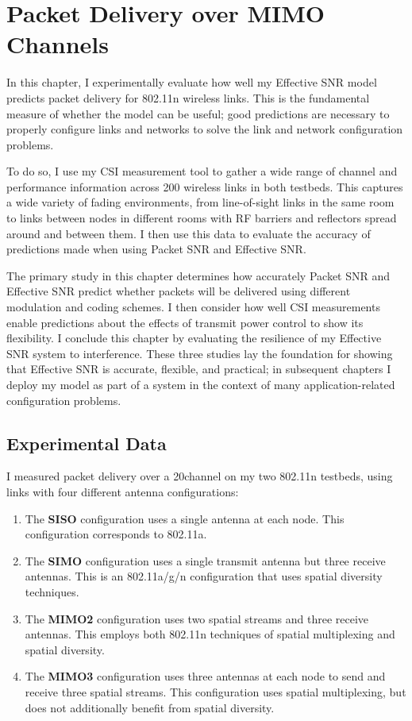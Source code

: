 \ifx\mainfile\undefined

\setcounter{chapter}{5} %
\fi

\cleardoublepage
\chapter{Packet Delivery over MIMO Channels}
\label{chap:delivery}

In this chapter, I experimentally evaluate how well my Effective SNR model predicts packet delivery for 802.11n wireless links. This is the fundamental measure of whether the model can be useful; good predictions are necessary to properly configure links and networks to solve the link and network configuration problems.

To do so, I use my CSI measurement tool to gather a wide range of channel and performance information across 200 wireless links in both testbeds. This captures a wide variety of fading environments, from line-of-sight links in the same room to links between nodes in different rooms with RF barriers and reflectors spread around and between them. I then use this data to evaluate the accuracy of predictions made when using Packet SNR and Effective SNR.

The primary study in this chapter determines how accurately Packet SNR and Effective SNR predict whether packets will be delivered using different modulation and coding schemes. I then consider how well CSI measurements enable predictions about the effects of transmit power control to show its flexibility. I conclude this chapter by evaluating the resilience of my Effective SNR system to interference. These three studies lay the foundation for showing that Effective SNR is accurate, flexible, and practical; in subsequent chapters I deploy my model as part of a system in the context of many application-related configuration problems.

\section{Experimental Data}
I measured packet delivery over a 20\MHz channel on my two 802.11n testbeds, using links with four different antenna configurations:
\begin{enumerate}
\item The \textbf{SISO} configuration uses a single antenna at each node. This configuration corresponds to 802.11a.
\item The \textbf{SIMO} configuration uses a single transmit antenna but three receive antennas. This is an 802.11a/g/n configuration that uses spatial diversity techniques.
\item The \textbf{MIMO2} configuration uses two spatial streams and three receive antennas. This employs both 802.11n techniques of spatial multiplexing and spatial diversity.
\item The \textbf{MIMO3} configuration uses three antennas at each node to send and receive three spatial streams. This configuration uses spatial multiplexing, but does not additionally benefit from spatial diversity.
\end{enumerate}

